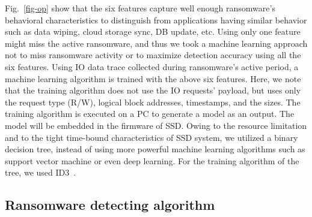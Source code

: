 \documentclass[conference]{IEEEtran}
\begin{document}
Fig.~\ref{fig-op} show that the six features capture well enough ransomware's behavioral characteristics
to distinguish from applications having similar behavior such as data wiping, cloud storage sync, DB update, etc.
Using only one feature might miss the active ransomware, 
and thus we took a machine learning approach not to miss 
ransomware activity or to maximize detection accuracy using all the six features. 
Using IO data trace collected during ransomware's active period, 
a machine learning algorithm is trained with the above six features. 
Here, we note that the training algorithm does not use the IO requests' payload, 
but uses only the request type (R/W), logical block addresses, timestamps, and the sizes.
The training algorithm is executed on a PC to generate a model as an output.
The model will be embedded in the firmware of SSD.
Owing to the resource limitation and to the tight time-bound characteristics of SSD system,
we utilized a binary decision tree, instead of using more powerful machine learning
algorithms such as support vector machine or even deep learning.
For the training algorithm of the tree, we used ID3~\cite{quinlan86}.



\subsection{Ransomware detecting algorithm}
\label{sec:detection}
\end{document}
